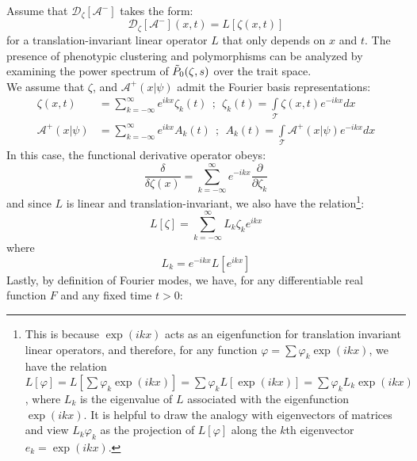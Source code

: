 Assume that $\mathcal{D}_{\zeta}[\mathcal{A}^{-}]$ takes the form:
\begin{equation*}
 \mathcal{D}_{\zeta}[\mathcal{A}^-](x,t) = L[\zeta(x,t)]   
\end{equation*}
for a translation-invariant linear operator $L$ that only depends on $x$ and $t$. The presence of phenotypic clustering and polymorphisms can be analyzed by examining the power spectrum of $\Tilde{P}_{0}(\zeta,s)$ over the trait space.\\
We assume that $\zeta$, and $\mathcal{A}^{+}(x|\psi)$ admit the Fourier basis representations:
\begin{equation}
\label{fourier_representations_functions}
\begin{aligned}
\zeta(x,t) &= \sum\limits_{k=-\infty}^{\infty}e^{ikx}\zeta_k(t) \ \ ; \ \ \zeta_k(t) = \int\limits_{\mathcal{T}}\zeta(x,t)e^{-ikx}dx\\
\mathcal{A}^{+}(x|\psi) &= \sum\limits_{k=-\infty}^{\infty}e^{ikx}A_k(t) \ \ ; \ \ A_k(t) = \int\limits_{\mathcal{T}}\mathcal{A}^{+}(x|\psi)e^{-ikx}dx
\end{aligned}
\end{equation}
In this case, the functional derivative operator obeys:
\begin{equation}
\label{fourier_representations_derivative}
    \frac{\delta}{\delta \zeta(x)} = \sum\limits_{k=-\infty}^{\infty}e^{-ikx}\frac{\partial}{\partial \zeta_k}
\end{equation}
and since $L$ is linear and translation-invariant, we also have the relation\footnote{This is because $\exp(ikx)$ acts as an eigenfunction for translation invariant linear operators, and therefore, for any function $\varphi = \sum\varphi_k\exp(ikx)$, we have the relation $L[\varphi] = L[\sum\varphi_k\exp(ikx)]=\sum\varphi_kL[\exp(ikx)]=\sum\varphi_kL_k\exp(ikx)$, where $L_k$ is the eigenvalue of $L$ associated with the eigenfunction $\exp(ikx)$. It is helpful to draw the analogy with eigenvectors of matrices and view $L_k\varphi_k$ as the projection of $L[\varphi]$ along the $k$th eigenvector $e_k = \exp(ikx)$.}:
\begin{equation}
\label{fourier_representation_linear_operator}
    L[\zeta] = \sum\limits_{k=-\infty}^{\infty}L_{k}\zeta_ke^{ikx}
\end{equation}
where 
\begin{equation*}
    L_k = e^{-ikx}L[e^{ikx}]
\end{equation*}
Lastly, by definition of Fourier modes, we have, for any differentiable real function $F$ and any fixed time $t > 0$:
